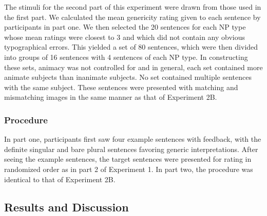 \documentclass[10pt,letterpaper]{article}
\begin{document}
The stimuli for the second part of this experiment were drawn from those used in the first part. We calculated the mean genericity rating given to each sentence by participants in part one. We then selected the 20 sentences for each NP type whose mean ratings were closest to 3 and which did not contain any obvious typographical errors. This yielded a set of 80 sentences, which were then divided into groups of 16 sentences with 4 sentences of each NP type. In constructing these sets, animacy was not controlled for and in general, each set contained more animate subjects than inanimate subjects. No set contained multiple sentences with the same subject. These sentences were presented with matching and mismatching images in the same manner as that of Experiment 2B. 

\subsubsection{Procedure} 

In part one, participants first saw four example sentences with feedback, with the definite singular and bare plural sentences favoring generic interpretations. After seeing the example sentences, the target sentences were presented for rating in randomized order as in part 2 of Experiment 1. In part two, the procedure was identical to that of Experiment 2B. 



\subsection{Results and Discussion}
\end{document}
